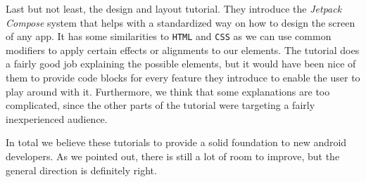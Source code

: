 Last but not least, the design and layout tutorial. They introduce the \textsl{Jetpack Compose} system that helps with a standardized way on how to design the screen of any app. It has some similarities to \texttt{HTML} and \texttt{CSS} as we can use common modifiers to apply certain effects or alignments to our elements.
The tutorial does a fairly good job explaining the possible elements, but it would have been nice of them to provide code blocks for every feature they introduce to enable the user to play around with it. Furthermore, we think that some explanations are too complicated, since the other parts of the tutorial were targeting a fairly inexperienced audience.

In total we believe these tutorials to provide a solid foundation to new android developers. As we pointed out, there is still a lot of room to improve, but the general direction is definitely right.

